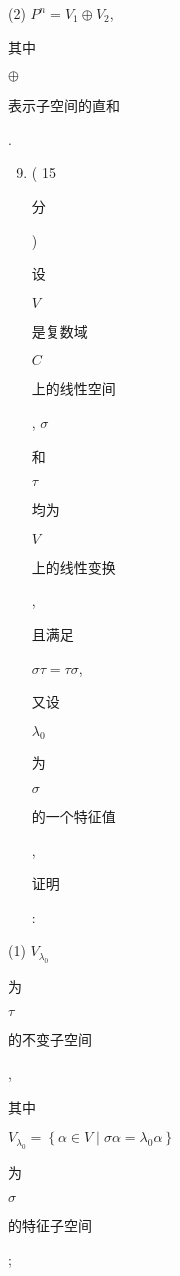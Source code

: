 \documentclass[10pt]{article}
\begin{document}
(2) $P^{n}=V_{1} \oplus V_{2}$, \begin{CJK}{UTF8}{mj}其中\end{CJK} $\oplus$ \begin{CJK}{UTF8}{mj}表示子空间的直和\end{CJK}.

\begin{enumerate}
  \setcounter{enumi}{8}
  \item ( 15 \begin{CJK}{UTF8}{mj}分\end{CJK}) \begin{CJK}{UTF8}{mj}设\end{CJK} $V$ \begin{CJK}{UTF8}{mj}是复数域\end{CJK} $C$ \begin{CJK}{UTF8}{mj}上的线性空间\end{CJK}, $\sigma$ \begin{CJK}{UTF8}{mj}和\end{CJK} $\tau$ \begin{CJK}{UTF8}{mj}均为\end{CJK} $V$ \begin{CJK}{UTF8}{mj}上的线性变换\end{CJK}, \begin{CJK}{UTF8}{mj}且满足\end{CJK} $\sigma \tau=\tau \sigma$, \begin{CJK}{UTF8}{mj}又设\end{CJK} $\lambda_{0}$ \begin{CJK}{UTF8}{mj}为\end{CJK} $\sigma$ \begin{CJK}{UTF8}{mj}的一个特征值\end{CJK}, \begin{CJK}{UTF8}{mj}证明\end{CJK}:
\end{enumerate}
(1) $V_{\lambda_{0}}$ \begin{CJK}{UTF8}{mj}为\end{CJK} $\tau$ \begin{CJK}{UTF8}{mj}的不变子空间\end{CJK}, \begin{CJK}{UTF8}{mj}其中\end{CJK} $V_{\lambda_{0}}=\left\{\alpha \in V \mid \sigma \alpha=\lambda_{0} \alpha\right\}$ \begin{CJK}{UTF8}{mj}为\end{CJK} $\sigma$ \begin{CJK}{UTF8}{mj}的特征子空间\end{CJK};
\end{document}
